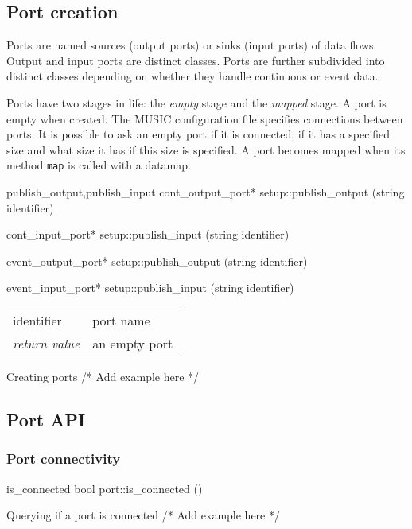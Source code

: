\documentclass[a4paper]{report}
\begin{document}
\subsection{Port creation}

Ports are named sources (output ports) or sinks (input ports) of data
flows.  Output and input ports are distinct classes.  Ports are
further subdivided into distinct classes depending on whether they
handle continuous or event data.

Ports have two stages in life: the \emph{empty} stage and the
\emph{mapped} stage.  A port is empty when created.  The MUSIC
configuration file specifies connections between ports.  It is
possible to ask an empty port if it is connected, if it has a
specified size and what size it has if this size is specified.  A port
becomes mapped when its method \verb|map| is called with a datamap.

\begin{head}{publish_output,publish_input}
    cont_output_port* setup::publish_output (string identifier)

    cont_input_port* setup::publish_input (string identifier)

    event_output_port* setup::publish_output (string identifier)

    event_input_port* setup::publish_input (string identifier)
\end{head}
\begin{tabular}{ll}
  identifier          & port name \\
  \emph{return value} & an empty port \\
\end{tabular}

\begin{code}{Creating ports}
  /* Add example here */
\end{code}

\subsection{Port API}

\subsubsection{Port connectivity}

\begin{head}{is_connected}
  bool port::is_connected ()
\end{head}

\begin{code}{Querying if a port is connected}
  /* Add example here */
\end{code}
\end{document}
